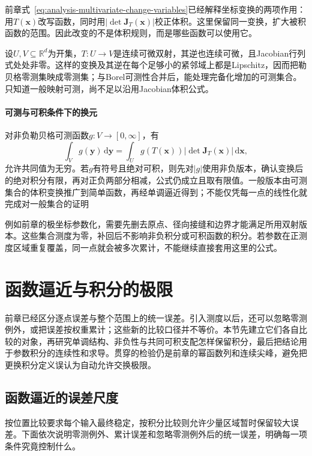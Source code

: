 前章式~\eqref{eq:analysis-multivariate-change-variables}已经解释坐标变换的两项作用：用$T(\bm x)$改写函数，同时用$|\det\bm J_T(\bm x)|$校正体积。这里保留同一变换，扩大被积函数的范围。因此改变的不是体积规则，而是哪些函数可以使用它。

设$U,V\subseteq\mathbb R^d$为开集，$T:U\to V$是连续可微双射，其逆也连续可微，且Jacobian行列式处处非零。这样的变换及其逆在每个足够小的紧邻域上都是Lipschitz，因而把勒贝格零测集映成零测集；与Borel可测性合并后，能处理完备化增加的可测集合。只知道一般映射可测，尚不足以沿用Jacobian体积公式。

\paragraph{可测与可积条件下的换元}

对非负勒贝格可测函数$g:V\to[0,\infty]$，有
\begin{equation}
 \int_Vg(\bm y)\,\mathrm d\bm y
 =\int_Ug(T(\bm x))|\det\bm J_T(\bm x)|\,\mathrm d\bm x,
\label{eq:measurable-change-variables}
\end{equation}
允许共同值为无穷。若$g$有符号且绝对可积，则先对$|g|$使用非负版本，确认变换后的绝对积分有限，再对正负两部分相减，公式仍成立且取有限值。一般版本由可测集合的体积变换推广到简单函数，再经单调逼近得到；不能仅凭每一点的线性化就完成对一般集合的证明

例如前章的极坐标参数化，需要先删去原点、径向接缝和边界才能满足所用双射版本。这些集合测度为零，补回后不影响非负积分或可积函数的积分。若参数在正测度区域重复覆盖，同一点就会被多次累计，不能继续直接套用这里的公式。

\FloatBarrier
\section{函数逼近与积分的极限}
\label{sec:measurable-convergence-and-integrals}

前章已经区分逐点误差与整个范围上的统一误差。引入测度以后，还可以忽略零测例外，或把误差按权重累计；这些新的比较口径并不等价。本节先建立它们各自比较的对象，再研究单调结构、非负性与共同可积支配怎样保留积分，最后把结论用于参数积分的连续性和求导。贯穿的检验仍是前章的幂函数列和连续尖峰，避免把更换积分定义误认为自动允许交换极限。

\subsection{函数逼近的误差尺度}

按位置比较要求每个输入最终稳定，按积分比较则允许少量区域暂时保留较大误差。下面依次说明零测例外、累计误差和忽略零测例外后的统一误差，明确每一项条件究竟控制什么。

